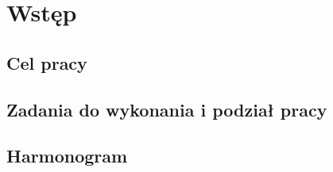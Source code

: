 \chapter{Wstęp}

\section{Cel pracy}


\section{Zadania do wykonania i podział pracy}

\section{Harmonogram}

